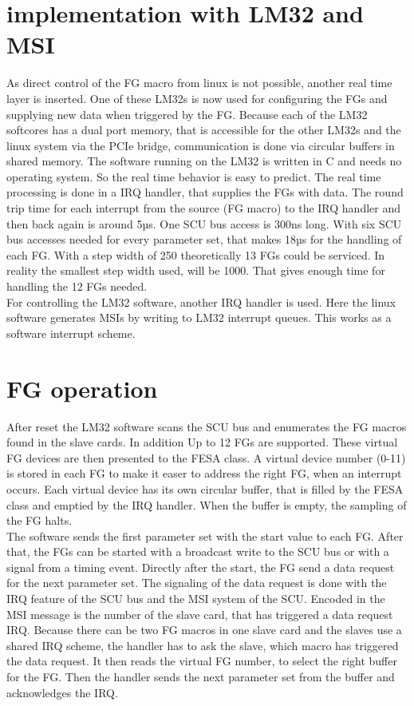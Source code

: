 \documentclass[a4paper,
              ]{jacow}
\begin{document}
\section{implementation with LM32 and MSI}
As direct control of the FG macro from linux is not possible, another real time layer is inserted. 
One of these LM32s is now used for configuring the FGs and supplying new data when triggered by the FG.
Because each of the LM32 softcores has a dual port memory, that is accessible for the other LM32s and the linux system via the PCIe bridge, communication is done via circular buffers in shared memory. The software running on the LM32 is written in C and needs no operating system. So the real time behavior is easy to predict. The real time processing is done in a IRQ handler, that supplies the FGs with data. The round trip time for each interrupt from the source (FG macro) to the IRQ handler and then back again is around 5µs. One SCU bus access is 300ns long. With six SCU bus accesses needed for every parameter set, that makes 18µs for the handling of each FG. With a step width of 250 theoretically 13 FGs could be serviced. In reality the smallest step width used, will be 1000. That gives enough time for handling the 12 FGs needed.\\
For controlling the LM32 software, another IRQ handler is used. Here the linux software generates MSIs by writing to LM32 interrupt queues. This works as a software interrupt scheme.

\section{FG operation}
After reset the LM32 software scans the SCU bus and enumerates the FG macros found in the slave cards. In addition  Up to 12 FGs are supported. These virtual FG devices are then presented to the FESA class. A virtual device number (0-11) is stored in each FG to make it easer to address the right FG, when an interrupt occurs.
Each virtual device has its own circular buffer, that is filled by the FESA class and emptied by the IRQ handler.
When the buffer is empty, the sampling of the FG halts.\\
The software sends the first parameter set with the start value to each FG. After that, the FGs can be started with a broadcast write to the SCU bus or with a signal from a timing event. Directly after the start, the FG send a data request for the next parameter set. The signaling of the data request is done with the IRQ feature of the SCU bus and the MSI system of the SCU. Encoded in the MSI message is the number of the slave card, that has triggered a data request IRQ. Because there can be two FG macros in one slave card and the slaves use a shared IRQ scheme, the handler has to ask the slave, which macro has triggered the data request. It then reads the virtual FG number, to select the right buffer for the FG. Then the handler sends the next parameter set from the buffer and acknowledges the IRQ.
\end{document}
